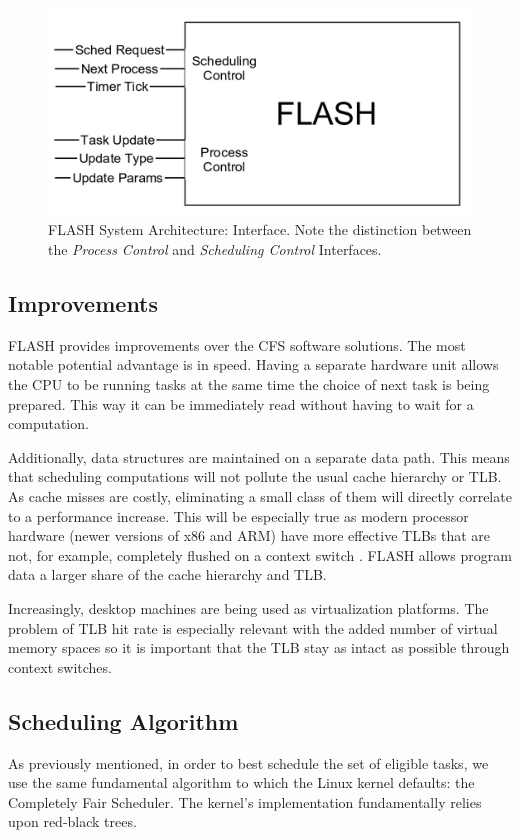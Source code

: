 \documentclass{sig-alternate-10pt}
\begin{document}
\begin{figure}
	\begin{center}
		\includegraphics[width=0.9\linewidth]{fig/flash-diagram.png}
		\caption{
			FLASH System Architecture: Interface.  Note the distinction between
			the \emph{Process Control} and \emph{Scheduling Control} Interfaces.
		}
		\label{fig:arch_overview}
	\end{center}
\end{figure}

\subsection{Improvements}
FLASH provides improvements over the CFS software solutions.  The most
notable potential advantage is in speed.  Having a separate hardware unit
allows the CPU to be running tasks at the same time the choice of next task
is being prepared.  This way it can be immediately read without having to
wait for a computation.

Additionally, data structures are maintained on a separate data path.  This
means that scheduling computations will not pollute the usual cache
hierarchy or TLB.  As cache misses are costly, eliminating a small class of
them will directly correlate to a performance increase.  This will be
especially true as modern processor hardware (newer versions of x86 and ARM)
have more effective TLBs that are not, for example, completely flushed on
a context switch \cite{neiger2006intel}.  FLASH allows program data a larger
share of the cache hierarchy and TLB.

Increasingly, desktop machines are being used as virtualization platforms.
The problem of TLB hit rate is especially relevant with the added number of
virtual memory spaces so it is important that the TLB stay as intact as
possible through context switches.

\subsection{Scheduling Algorithm}
As previously mentioned, in order to best schedule the set of eligible
tasks, we use the same fundamental algorithm to which the Linux kernel
defaults: the Completely Fair Scheduler.  The kernel's implementation
fundamentally relies upon red-black trees.
\end{document}
